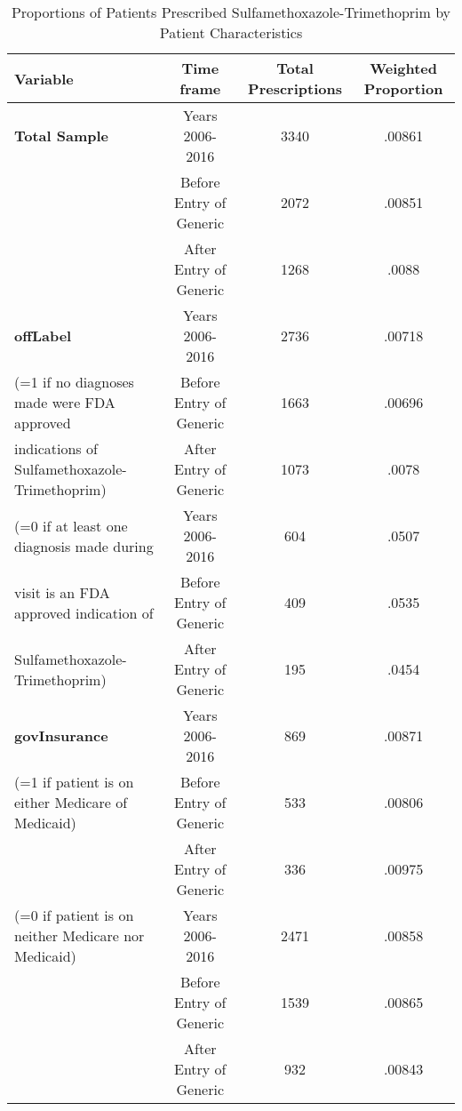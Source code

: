 \begin{table}[htbp]\centering
\def\sym#1{\ifmmode^{#1}\else\(^{#1}\)\fi}
\caption{Proportions of Patients Prescribed Sulfamethoxazole-Trimethoprim by Patient Characteristics\label{tab1}}
\begin{tabular}{l*{3}{c}}
\hline\hline
            Variable&\multicolumn{1}{c}{Time frame}&\multicolumn{1}{c}{Total Prescriptions}&\multicolumn{1}{c}{Weighted Proportion}\\
\hline
\textbf{Total Sample}                                   &     Years 2006-2016&                          3340&     .00861\\
                                                        &     Before Entry of Generic&    2072&     .00851\\
                                                        &     After Entry of Generic&      1268&     .0088\\
[1em]
\textbf{offLabel}                                       &     Years 2006-2016&             2736&     .00718\\
(=1 if no diagnoses made were FDA approved         &     Before Entry of Generic&    1663&     .00696\\
indications of Sulfamethoxazole-Trimethoprim)  &     After Entry of Generic&      1073&     .0078\\
[1em]
(=0 if at least one diagnosis made during               &     Years 2006-2016&             604&     .0507\\
visit is an FDA approved indication of                  &     Before Entry of Generic&    409&     .0535\\
Sulfamethoxazole-Trimethoprim)                          &     After Entry of Generic&      195&     .0454\\
[1em]
\textbf{govInsurance}                                   &     Years 2006-2016&             869&     .00871\\
(=1 if patient is on either Medicare of Medicaid)       &     Before Entry of Generic&     533 &     .00806\\
                                                        &     After Entry of Generic&      336 &     .00975\\
[1em]
(=0 if patient is on neither Medicare nor Medicaid)     &     Years 2006-2016&             2471&     .00858\\
                                                        &     Before Entry of Generic&     1539 &     .00865\\
                                                        &     After Entry of Generic&      932 &     .00843\\

\end{tabular}
\end{table}
